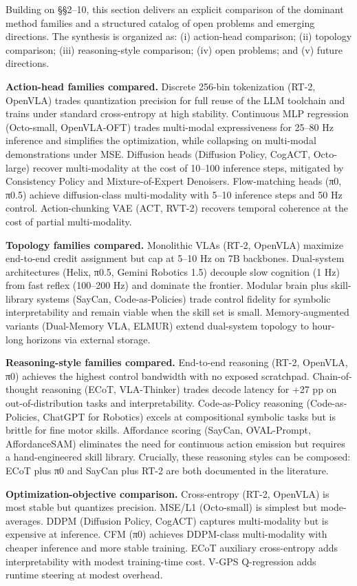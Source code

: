 Building on §§2--10, this section delivers an explicit comparison of the dominant method families and a structured catalog of open problems and emerging directions. The synthesis is organized as: (i) action-head comparison; (ii) topology comparison; (iii) reasoning-style comparison; (iv) open problems; and (v) future directions.

\textbf{Action-head families compared.} Discrete 256-bin tokenization (RT-2, OpenVLA) trades quantization precision for full reuse of the LLM toolchain and trains under standard cross-entropy at high stability. Continuous MLP regression (Octo-small, OpenVLA-OFT) trades multi-modal expressiveness for 25--80 Hz inference and simplifies the optimization, while collapsing on multi-modal demonstrations under MSE. Diffusion heads (Diffusion Policy, CogACT, Octo-large) recover multi-modality at the cost of 10--100 inference steps, mitigated by Consistency Policy and Mixture-of-Expert Denoisers. Flow-matching heads (π0, π0.5) achieve diffusion-class multi-modality with 5--10 inference steps and 50 Hz control. Action-chunking VAE (ACT, RVT-2) recovers temporal coherence at the cost of partial multi-modality.

\textbf{Topology families compared.} Monolithic VLAs (RT-2, OpenVLA) maximize end-to-end credit assignment but cap at 5--10 Hz on 7B backbones. Dual-system architectures (Helix, π0.5, Gemini Robotics 1.5) decouple slow cognition (1 Hz) from fast reflex (100--200 Hz) and dominate the frontier. Modular brain plus skill-library systems (SayCan, Code-as-Policies) trade control fidelity for symbolic interpretability and remain viable when the skill set is small. Memory-augmented variants (Dual-Memory VLA, ELMUR) extend dual-system topology to hour-long horizons via external storage.

\textbf{Reasoning-style families compared.} End-to-end reasoning (RT-2, OpenVLA, π0) achieves the highest control bandwidth with no exposed scratchpad. Chain-of-thought reasoning (ECoT, VLA-Thinker) trades decode latency for +27 pp on out-of-distribution tasks and interpretability. Code-as-Policy reasoning (Code-as-Policies, ChatGPT for Robotics) excels at compositional symbolic tasks but is brittle for fine motor skills. Affordance scoring (SayCan, OVAL-Prompt, AffordanceSAM) eliminates the need for continuous action emission but requires a hand-engineered skill library. Crucially, these reasoning styles can be composed: ECoT plus π0 and SayCan plus RT-2 are both documented in the literature.

\textbf{Optimization-objective comparison.} Cross-entropy (RT-2, OpenVLA) is most stable but quantizes precision. MSE/L1 (Octo-small) is simplest but mode-averages. DDPM (Diffusion Policy, CogACT) captures multi-modality but is expensive at inference. CFM (π0) achieves DDPM-class multi-modality with cheaper inference and more stable training. ECoT auxiliary cross-entropy adds interpretability with modest training-time cost. V-GPS Q-regression adds runtime steering at modest overhead.

